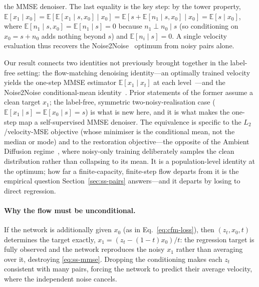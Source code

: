 \documentclass[letterpaper]{article} %
\begin{document}
the MMSE denoiser.  The last equality is the key step: by the tower property,
$\mathbb{E}[x_1\mid x_0]=\mathbb{E}\!\left[\mathbb{E}[x_1\mid s,x_0]\mid
x_0\right]=\mathbb{E}\!\left[s+\mathbb{E}[n_1\mid s,x_0]\mid x_0\right]
=\mathbb{E}[s\mid x_0]$, where $\mathbb{E}[n_1\mid s,x_0]=\mathbb{E}[n_1\mid
s]=0$ because $n_1\perp n_0\mid s$ (so conditioning on $x_0=s+n_0$ adds
nothing beyond $s$) and $\mathbb{E}[n_i\mid s]=0$.  A single velocity
evaluation thus recovers the Noise2Noise~\cite{lehtinen2018noise2noise}
optimum from noisy pairs alone.

Our result connects two identities not previously brought together in the
label-free setting: the flow-matching denoising identity---an optimally trained velocity
yields the one-step MMSE estimator $\mathbb{E}[x_1\mid x_t]$ at each
level~\cite{gagneux2025phases,albergo2023stochastic}---and the Noise2Noise
conditional-mean identity~\cite{lehtinen2018noise2noise}.  Prior statements of
the former assume a clean target $x_1$; the label-free, symmetric
two-noisy-realisation case ($\mathbb{E}[x_1\mid s]=\mathbb{E}[x_0\mid s]=s$) is
what is new here, and it is what makes the one-step map a self-supervised MMSE
denoiser.  The equivalence is specific to the $L_2$/velocity-MSE objective
(whose minimiser is the conditional mean, not the median or mode) and to the
restoration objective---the opposite of the Ambient Diffusion
regime~\cite{daras2023ambient}, where noisy-only training deliberately
samples the clean distribution rather than collapsing to its mean.  It is
a population-level identity at the optimum; how far a finite-capacity,
finite-step flow departs from it is the empirical question
Section~\ref{sec:ss-pairs} answers---and it departs by losing to direct
regression.

\paragraph{Why the flow must be unconditional.}
If the network is additionally given $x_0$ (as in
Eq.~\eqref{eq:cfm-loss}), then $(z_t,x_0,t)$ determines the target exactly,
$x_1=(z_t-(1-t)x_0)/t$: the regression target is fully observed and the
network reproduces the noisy $x_1$ rather than averaging over it,
destroying \eqref{eq:ss-mmse}.  Dropping the conditioning makes each $z_t$
consistent with many pairs, forcing the network to predict their average
velocity, where the independent noise cancels.
\end{document}
